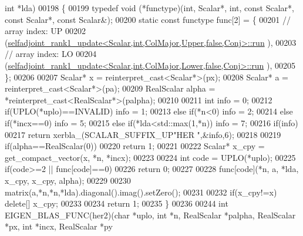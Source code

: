 \begin{DoxyCode}
       \textcolor{keywordtype}{int} *lda)
00198 \{
00199   \textcolor{keyword}{typedef} void (*functype)(int, Scalar*, int, \textcolor{keyword}{const} Scalar*, \textcolor{keyword}{const} Scalar*, \textcolor{keyword}{const} Scalar&);
00200   \textcolor{keyword}{static} \textcolor{keyword}{const} functype func[2] = \{
00201     \textcolor{comment}{// array index: UP}
00202     (\hyperlink{struct_eigen_1_1selfadjoint__rank1__update}{selfadjoint\_rank1\_update<Scalar,int,ColMajor,Upper,false,Conj>::run}
      ),
00203     \textcolor{comment}{// array index: LO}
00204     (\hyperlink{struct_eigen_1_1selfadjoint__rank1__update}{selfadjoint\_rank1\_update<Scalar,int,ColMajor,Lower,false,Conj>::run}
      ),
00205   \};
00206 
00207   Scalar* x = \textcolor{keyword}{reinterpret\_cast<}Scalar*\textcolor{keyword}{>}(px);
00208   Scalar* a = \textcolor{keyword}{reinterpret\_cast<}Scalar*\textcolor{keyword}{>}(pa);
00209   RealScalar alpha = *\textcolor{keyword}{reinterpret\_cast<}RealScalar*\textcolor{keyword}{>}(palpha);
00210 
00211   \textcolor{keywordtype}{int} info = 0;
00212   \textcolor{keywordflow}{if}(UPLO(*uplo)==INVALID)                                            info = 1;
00213   \textcolor{keywordflow}{else} \textcolor{keywordflow}{if}(*n<0)                                                       info = 2;
00214   \textcolor{keywordflow}{else} \textcolor{keywordflow}{if}(*incx==0)                                                   info = 5;
00215   \textcolor{keywordflow}{else} \textcolor{keywordflow}{if}(*lda<std::max(1,*n))                                        info = 7;
00216   \textcolor{keywordflow}{if}(info)
00217     \textcolor{keywordflow}{return} xerbla\_(SCALAR\_SUFFIX\_UP\textcolor{stringliteral}{"HER  "},&info,6);
00218 
00219   \textcolor{keywordflow}{if}(alpha==RealScalar(0))
00220     \textcolor{keywordflow}{return} 1;
00221 
00222   Scalar* x\_cpy = get\_compact\_vector(x, *n, *incx);
00223 
00224   \textcolor{keywordtype}{int} code = UPLO(*uplo);
00225   \textcolor{keywordflow}{if}(code>=2 || func[code]==0)
00226     \textcolor{keywordflow}{return} 0;
00227 
00228   func[code](*n, a, *lda, x\_cpy, x\_cpy, alpha);
00229 
00230   matrix(a,*n,*n,*lda).diagonal().imag().setZero();
00231 
00232   \textcolor{keywordflow}{if}(x\_cpy!=x)  \textcolor{keyword}{delete}[] x\_cpy;
00233 
00234   \textcolor{keywordflow}{return} 1;
00235 \}
00236 
00244 \textcolor{keywordtype}{int} EIGEN\_BLAS\_FUNC(her2)(\textcolor{keywordtype}{char} *uplo, \textcolor{keywordtype}{int} *n, RealScalar *palpha, RealScalar *px, \textcolor{keywordtype}{int} *incx, RealScalar *py

\end{DoxyCode}
